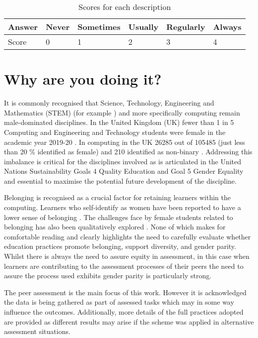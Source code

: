 \documentclass[sigconf, anonymous=true]{acmart}
\begin{document}
\begin{table}[]
\caption{Scores for each description}
\begin{tabular}{|l|l|l|l|l|l|}
\hline
Answer & Never & Sometimes & Usually & Regularly & Always \\ \hline
Score  & 0     & 1         & 2       & 3         & 4      \\ \hline
\end{tabular}
\label{tab:scores}
\end{table}


\section{Why are you doing it?}
It is commonly recognised that Science, Technology, Engineering and Mathematics (STEM) (for example \cite{Baird2018}) and more specifically computing remain male-dominated disciplines. In the United Kingdom (UK) fewer than 1 in 5 Computing and Engineering and Technology students were female in the academic year 2019-20 \cite{HESA}. In computing in the UK 26285 out of 105485 (just less than 20 \% identified as female) and 210 identified as non-binary \cite{HESA}. Addressing this imbalance is critical for the disciplines involved as is articulated in the United Nations Sustainability Goals 4 Quality Education and Goal 5 Gender Equality \cite{UN} and essential to maximise the potential future development of the discipline.

Belonging \cite{Veilleux2013} is recognised as a crucial factor for retaining learners within the computing. Learners who self-identify as women have been reported to have a lower sense of belonging \cite{Mooney2020}. The challenges face by female students related to belonging has also been qualitatively explored \cite{Winter2021}. None of which makes for comfortable reading and clearly highlights the need to carefully evaluate whether education practices promote belonging, support diversity, and gender parity. Whilst there is always the need to assure equity in assessment, in this case when learners are contributing to the assessment processes of their peers the need to assure the process used exhibits gender parity is particularly strong. 

The peer assessment is the main focus of this work. However it is acknowledged the data is being gathered as part of assessed tasks which may in some way influence the outcomes. Additionally, more details of the full practices adopted are provided as different results may arise if the scheme was applied in alternative assessment situations.
\end{document}
